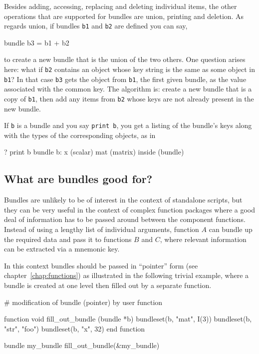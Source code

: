 Besides adding, accessing, replacing and deleting individual items,
the other operations that are supported for bundles are union,
printing and deletion. As regards union, if bundles \texttt{b1} and
\texttt{b2} are defined you can say,

\begin{code}
bundle b3 = b1 + b2
\end{code}

to create a new bundle that is the union of the two others. One
question arises here: what if \texttt{b2} contains an object whose key
string is the same as some object in \texttt{b1}?  In that case
\texttt{b3} gets the object from \texttt{b1}, the first given bundle,
as the value associated with the common key.  The algorithm is: create
a new bundle that is a copy of \texttt{b1}, then add any items from
\texttt{b2} whose keys are not already present in the new bundle.

If \texttt{b} is a bundle and you say \texttt{print b}, you get a
listing of the bundle's keys along with the types of the corresponding
objects, as in

\begin{code}
? print b
bundle b:
 x (scalar)
 mat (matrix)
 inside (bundle)
\end{code}

\subsection{What are bundles good for?}

Bundles are unlikely to be of interest in the context of standalone
 scripts, but they can be very useful in the context of
complex function packages where a good deal of information has to be
passed around between the component functions. Instead of using a
lengthy list of individual arguments, function $A$ can bundle up the
required data and pass it to functions $B$ and $C$, where relevant
information can be extracted via a mnemonic key.

In this context bundles should be passed in ``pointer'' form
(see chapter~\ref{chap:functions}) as illustrated in the following
trivial example, where a bundle is created at one level then filled
out by a separate function.

\begin{code}
# modification of bundle (pointer) by user function

function void fill_out_bundle (bundle *b)
  bundleset(b, "mat", I(3))
  bundleset(b, "str", "foo")
  bundleset(b, "x", 32)
end function

bundle my_bundle 
fill_out_bundle(&my_bundle)
\end{code}

